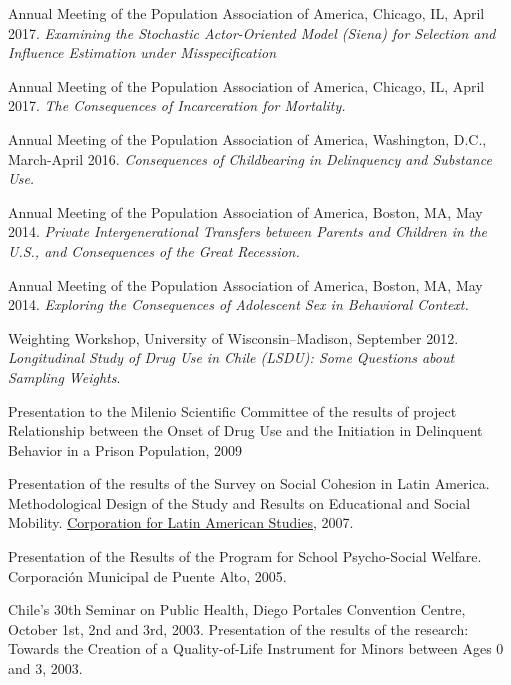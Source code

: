 \documentclass[10pt,letterpaper]{article}
\renewenvironment{itemize}{
  \begin{list}{}{
    \setlength{\leftmargin}{1.5em}
    \setlength{\itemsep}{0.25em}
    \setlength{\parskip}{0pt}
    \setlength{\parsep}{0.25em}
  }
}{
  \end{list}
}
\begin{document}
\begin{itemize}
\item  Annual Meeting of the Population Association of America, Chicago, IL, April 2017. {\textit{Examining the Stochastic Actor-Oriented Model (Siena) for Selection and Influence Estimation under Misspecification}}

\item  Annual Meeting of the Population Association of America, Chicago, IL, April 2017. {\textit{The Consequences of Incarceration for Mortality.}}

\item  Annual Meeting of the Population Association of America, Washington, D.C., March-April 2016. {\textit{Consequences of Childbearing in Delinquency and Substance Use.}}

\item  Annual Meeting of the Population Association of America, Boston, MA, May 2014. {\textit{Private Intergenerational Transfers between Parents and Children in the U.S., and Consequences of the Great Recession.}}

\item  Annual Meeting of the Population Association of America, Boston, MA, May 2014. {\textit{Exploring the Consequences of Adolescent Sex in Behavioral Context.}}

\item Weighting Workshop, University of Wisconsin–Madison, September 2012. \textit{Longitudinal Study of Drug Use in Chile (LSDU): Some Questions about Sampling Weights}.

\item	Presentation to the Milenio Scientific Committee of the results of project Relationship between the Onset of Drug Use and the Initiation in Delinquent Behavior in a Prison Population, 2009

\item Presentation of the results of the Survey on Social Cohesion in Latin America. Methodological Design of the Study and Results on Educational and Social Mobility. \href{http://www.cieplan.org/}{Corporation for Latin American Studies}, 2007.

\item Presentation of the Results of the Program for School Psycho-Social Welfare. Corporación Municipal de Puente Alto, 2005.

\item Chile’s 30th Seminar on Public Health, Diego Portales Convention Centre, October 1st, 2nd and 3rd, 2003. Presentation of the results of the research: Towards the Creation of a Quality-of-Life Instrument for Minors between Ages 0 and 3, 2003.

\end{itemize}
\end{document}
